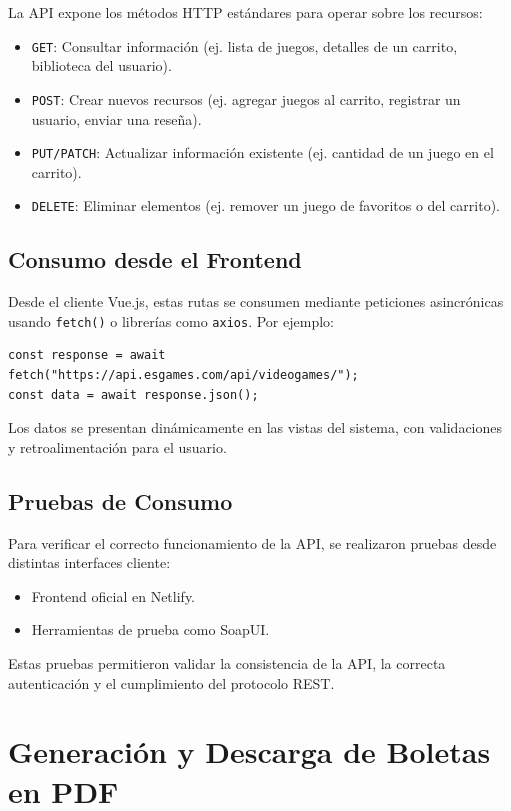 \documentclass{article}
\begin{document}
La API expone los métodos HTTP estándares para operar sobre los recursos:

\begin{itemize}
    \item \texttt{GET}: Consultar información (ej. lista de juegos, detalles de un carrito, biblioteca del usuario).
    \item \texttt{POST}: Crear nuevos recursos (ej. agregar juegos al carrito, registrar un usuario, enviar una reseña).
    \item \texttt{PUT/PATCH}: Actualizar información existente (ej. cantidad de un juego en el carrito).
    \item \texttt{DELETE}: Eliminar elementos (ej. remover un juego de favoritos o del carrito).
\end{itemize}

\subsection{Consumo desde el Frontend}

Desde el cliente Vue.js, estas rutas se consumen mediante peticiones asincrónicas usando \texttt{fetch()} o librerías como \texttt{axios}. Por ejemplo:

\begin{verbatim}
const response = await fetch("https://api.esgames.com/api/videogames/");
const data = await response.json();
\end{verbatim}

Los datos se presentan dinámicamente en las vistas del sistema, con validaciones y retroalimentación para el usuario.

\subsection{Pruebas de Consumo}

Para verificar el correcto funcionamiento de la API, se realizaron pruebas desde distintas interfaces cliente:

\begin{itemize}
    \item Frontend oficial en Netlify.
    \item Herramientas de prueba como SoapUI.
\end{itemize}

Estas pruebas permitieron validar la consistencia de la API, la correcta autenticación y el cumplimiento del protocolo REST.
\section{Generación y Descarga de Boletas en PDF}
\end{document}
